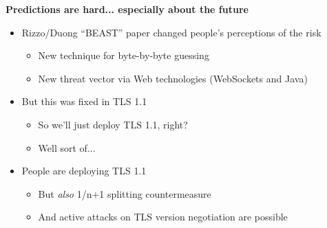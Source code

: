 \documentclass[helvetica]{seminar}
\newcommand{\heading}[1]{%
  \begin{center} 
    \large\bf 
    #1 
  \end{center} 
  \vspace{.4 in}}
\begin{document}
\begin{slide}
\heading{Predictions are hard... especially about the future}

\vspace{-.25in}
\begin{itemize}
\item Rizzo/Duong ``BEAST'' paper changed people's perceptions of the risk
  \begin{itemize}
  \item New technique for byte-by-byte guessing
  \item New threat vector via Web technologies (WebSockets and Java)
  \end{itemize}

\item But this was fixed in TLS 1.1
  \begin{itemize}
  \item So we'll just deploy TLS 1.1, right?
  \item Well sort of...
  \end{itemize}

\item People are deploying TLS 1.1
  \begin{itemize}
  \item But \emph{also} 1/n+1 splitting countermeasure
  \item And active attacks on TLS version negotiation are possible
  \end{itemize}

\end{itemize}
\end{slide}
\end{document}
